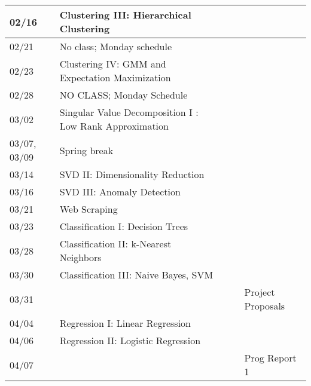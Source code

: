 \documentclass[11pt]{article}
\begin{document}
\begin{centering}
\begin{tabular}{||l|p{3in}|l|l|l||}
02/16 & Clustering III: Hierarchical Clustering & & & \\
\hline
02/21 & No class; Monday schedule & & & \\
02/23 & Clustering IV: GMM and Expectation Maximization& &  & \\ 
\hline
02/28 &  NO CLASS; Monday Schedule &  & &  \\   
03/02 & Singular Value Decomposition I : Low Rank Approximation & & & \\
\hline
03/07, 03/09& Spring break & & & \\
\hline
03/14 & SVD II: Dimensionality Reduction &&&\\
%
03/16 & SVD III: Anomaly Detection & &  & \\ 
\hline

 03/21 & Web Scraping & &  & \\ 
03/23 & Classification I: Decision Trees & & & \\ 
\hline

03/28 & Classification II: k-Nearest Neighbors & &  &\\ 
03/30 & Classification III: Naive Bayes, SVM & & &\\ 
03/31 & & & & Project Proposals \\
\hline

04/04 & Regression I: Linear Regression && &\\ 
04/06 & Regression II: Logistic Regression & & & \\ 
04/07 &&&& Prog Report 1\\
\hline


\end{tabular}
\end{centering}
\end{document}
